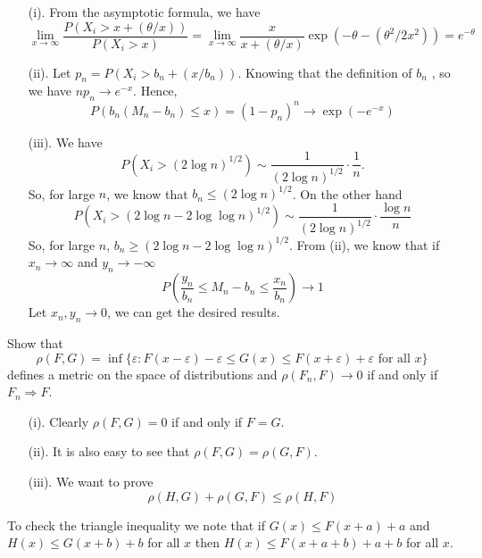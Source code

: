 \documentclass[en, normal, 12pt, black]{elegantnote}
\newenvironment{exercise}[1]{\begin{tcolorbox}[colback=black!15, colframe=black!80, breakable, title=#1]}{\end{tcolorbox}}
\newenvironment{solution}{\begin{tcolorbox}[colback=white, colframe=black!50, breakable, title=Solution. ]\setlength{\parskip}{0.8em}}{\end{tcolorbox}}
\begin{document}
    \begin{solution}
        \begin{itemize}
            \item[(i).] From the asymptotic formula, we have
        \[
            \lim _{x \rightarrow \infty} \frac{P\left(X_{i}>x+(\theta / x)\right)}{P\left(X_{i}>x\right)}=\lim _{x \rightarrow \infty} \frac{x}{x+(\theta / x)} \exp \left(-\theta-\left(\theta^{2} / 2 x^{2}\right)\right)=e^{-\theta}
        \]
            \item[(ii).] Let $p_{n}=P\left(X_{i}>b_{n}+\left(x / b_{n}\right)\right)$. Knowing that the definition of $b_{n}$ , so we have $n p_{n} \rightarrow e^{-x}$. Hence, \[
                P\left(b_{n}\left(M_{n}-b_{n}\right) \leq x\right)=\left(1-p_{n}\right)^{n} \rightarrow \exp \left(-e^{-x}\right)
            \]
            \item[(iii).] We have\[
                P\left(X_{i}>(2 \log n)^{1 / 2}\right) \sim \frac{1}{(2 \log n)^{1 / 2}} \cdot \frac{1}{n}. 
            \]
            So, for large $n$, we know that $b_{n} \leqslant(2 \log n)^{1 / 2}$. On the other hand
            \[
            P\left(X_{i}>(2 \log n-2 \log \log n)^{1 / 2}\right) \sim \frac{1}{(2 \log n)^{1 / 2}} \cdot \frac{\log n}{n}
            \]
            So, for large $n$, $b_{n} \geqslant(2 \log n-2 \log \log n)^{1 / 2}$. From (ii), we know that if $x_{n} \rightarrow \infty$ and $y_{n} \rightarrow-\infty$
            \[
            P\left(\frac{y_{n}}{b_{n}} \leq M_{n}-b_{n} \leq \frac{x_{n}}{b_{n}}\right) \rightarrow 1
            \]
            Let $x_{n}, y_{n}\rightarrow 0$, we can get the desired results. 
        \end{itemize}
    \end{solution}

    \begin{exercise}{3.2.6. The Lévy Metric}
        Show that
        \[
            \rho(F, G)=\inf \{\varepsilon: F(x-\varepsilon)-\varepsilon \leq G(x) \leq F(x+\varepsilon)+\varepsilon \text { for all } x\}
        \]
        defines a metric on the space of distributions and $\rho\left(F_{n}, F\right) \rightarrow 0$ if and only if $F_{n} \Rightarrow F$. 
    \end{exercise}

    \begin{solution}
        \begin{itemize}
            \item[(i).] Clearly $\rho(F, G)=0$ if and only if $F=G$. 
            \item[(ii).] It is also easy to see that $\rho(F, G)=\rho(G, F)$. 
            \item[(iii).] We want to prove \[
                \rho(H,G)+\rho(G,F)\leqslant\rho(H,F)
            \]
        \end{itemize} To check the triangle inequality we note that if $G(x) \leq F(x+a)+a$ and $H(x) \leq G(x+b)+b$ for all $x$ then $H(x) \leq F(x+a+b)+a+b$ for all $x$. 
    \end{solution}
\end{document}
